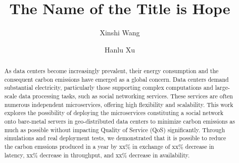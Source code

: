 \documentclass[acmlarge]{acmart}
\begin{document}
	
	\title{The Name of the Title is Hope}
	
	\author{Xinshi Wang}
	
	\author{Hanlu Xu}
	\renewcommand{\shortauthors}{Xinshi and Hanlu, et al.}
	
	\begin{abstract}
		As data centers become increasingly prevalent, their energy consumption and the consequent carbon emissions have emerged as a global concern. Data centers demand substantial electricity, particularly those supporting complex computations and large-scale data processing tasks, such as social networking services. These services are often numerous independent microservices, offering high flexibility and scalability. This work explores the possibility of deploying the microservices constituting a social network onto bare-metal servers in geo-distributed data centers to minimize carbon emissions as much as possible without impacting Quality of Service (QoS) significantly. Through simulations and real deployment tests, we demonstrated that it is possible to reduce the carbon emssions produced in a year by xx\% in exchange of xx\% decrease in latency,  xx\% decrease in throughput, and  xx\% decrease in availability.
	\end{abstract}
	
\end{document}

